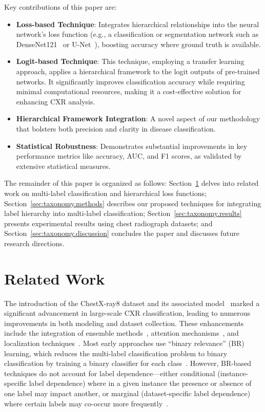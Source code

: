 \documentclass[review,1p,times,numbers]{elsarticle}
\begin{document}
Key contributions of this paper are:
\begin{itemize}
    \item \textbf{Loss-based Technique}: Integrates hierarchical relationships into the neural network's loss function (e.g., a classification or segmentation network such as DenseNet121~\cite{huang_Densely_2017} or U-Net~\cite{ronneberger_UNet_2015}), boosting accuracy where ground truth is available.
    \item \textbf{Logit-based Technique}: This technique, employing a transfer learning approach, applies a hierarchical framework to the logit outputs of pre-trained networks. It significantly improves classification accuracy while requiring minimal computational resources, making it a cost-effective solution for enhancing CXR analysis.
    \item \textbf{Hierarchical Framework Integration}: A novel aspect of our methodology that bolsters both precision and clarity in disease classification.
    \item \textbf{Statistical Robustness}: Demonstrates substantial improvements in key performance metrics like accuracy, AUC, and F1 scores, as validated by extensive statistical measures.
\end{itemize}
The remainder of this paper is organized as follows: Section~\ref{sec:taxonomy.relatedwork} delves into related work on multi-label classification and hierarchical loss functions; Section~\ref{sec:taxonomy.methods} describes our proposed techniques for integrating label hierarchy into multi-label classification; Section~\ref{sec:taxonomy.results} presents experimental results using chest radiograph datasets; and Section~\ref{sec:taxonomy.discussion} concludes the paper and discusses future research directions.

\section{Related Work}\label{sec:taxonomy.relatedwork}
The introduction of the ChestX-ray8 dataset and its associated model~\cite{wang_ChestXRay8_2017} marked a significant advancement in large-scale CXR classification, leading to numerous improvements in both modeling and dataset collection. These enhancements include the integration of ensemble methods~\cite{islam_Abnormality_2017}, attention mechanisms~\cite{guan_Diagnose_2018,liu_SDFN_2019}, and localization techniques~\cite{cai_Iterative_2018,guendel_MultiTask_2019,li_Thoracic_2018,yan_Weakly_2018}. Most early approaches use ``binary relevance'' (BR) learning, which reduces the multi-label classification problem to binary classification by training a binary classifier for each class~\cite{zhang_Review_2014}. However, BR-based techniques do not account for label dependence---either conditional (instance-specific label dependence) where in a given instance the presence or absence of one label may impact another, or marginal (dataset-specific label dependence) where certain labels may co-occur more frequently~\cite{dembczynski_Label_2012}.
\end{document}
